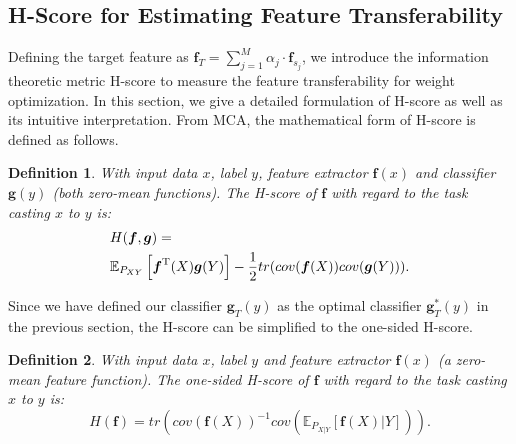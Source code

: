 \documentclass[letterpaper]{article} %
\newtheorem{definition}{Definition}
\begin{document}

\subsection{H-Score for Estimating Feature Transferability}

 Defining the target feature as $\boldsymbol{f}_T = \sum_{j=1}^M \alpha_j \cdot \boldsymbol{f}_{s_j}$, we introduce the information theoretic metric H-score \citep{huang2019information} to measure the feature transferability for weight optimization. In this section, we give a detailed formulation of H-score as well as its intuitive interpretation. From MCA, the mathematical form of H-score is defined as follows.

\begin{definition}
    With input data $x$, label $y$, feature extractor $\boldsymbol{f}(x)$ and classifier $\boldsymbol{g}(y)$ (both zero-mean functions). The H-score of $\boldsymbol{f}$ with regard to the task casting $x$ to $y$ is:
    \begin{align}
        &H(\boldsymbol{f},\boldsymbol{g}) = \nonumber\\
        &\mathbb{E}_{P_{XY}}\left[\boldsymbol{f}^{\rm T}(X)\boldsymbol{g}(Y)\right] - \frac{1}{2}tr(cov(\boldsymbol{f}(X)) cov(\boldsymbol{g}(Y))).
    \label{hscore}
    \end{align}
\label{def:hscore}    
\end{definition}

Since we have defined our classifier $\boldsymbol{g}_T(y)$ as the optimal classifier $\boldsymbol{g}_T^*(y)$ in the previous section, the H-score can be simplified to the one-sided H-score.

\begin{definition}
    With input data $x$, label $y$ and feature extractor $\boldsymbol{f}(x)$ (a zero-mean feature function). The one-sided H-score of $\boldsymbol{f}$ with regard to the task casting $x$ to $y$ is:
    \begin{equation}
        H(\boldsymbol{f}) = tr(cov(\boldsymbol{f}(X))^{-1}cov(\mathbb{E}_{P_{X|Y}}[\boldsymbol{f}(X)|Y])).
    \label{singlehscore}
    \end{equation}
 \label{def:singlehscore}
\end{definition}
\end{document}
